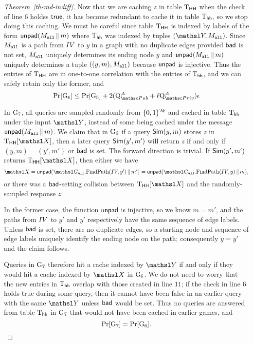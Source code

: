 \begin{proof}[Theorem~\ref{th-md-indiff}]
Now that we are caching $z$ in table $\text{T}_{\mathsf{HH}}$ when the check of line $6$ holdss $\mathsf{true}$,
it has become redundant to cache it in table $\text{T}_{\mathsf{hh}}$, so we stop doing this caching.
We must be careful since table $\text{T}_{\mathsf{HH}}$ is indexed by labels of the form $\mathsf{unpad}({M}_{\texttt{all}} {\,\|\,} m)$
where $\text{T}_{\mathsf{hh}}$ was indexed by tuples $(\YEDSA, \msg_{\all})$.
Since ${M}_{\texttt{all}}$ is a path from $IV$ to $y$ in a
graph with no duplicate edges provided $\mathsf{bad}$ is not set, ${M}_{\texttt{all}}$ uniquely
determines its ending node $y$ and $\mathsf{unpad}({M}_{\texttt{all}}{\,\|\,} m)$ uniquely determines a tuple
$((y, m), {M}_{\texttt{all}})$ because $\mathsf{unpad}$ is injective.
Thus the entries of $\text{T}_{\mathsf{HH}}$ are in one-to-one correlation with the entries of $\text{T}_{\mathsf{hh}}$, and we can safely retain only the former, and 
\[ \Pr[\Gm_6] \leq \Pr[\Gm_5] + 2(\Queries{\PubO}{\advA} + \ell \Queries{\PrivO}{\advA}) \epsilon \]

In $\textnormal{G}_7$, all queries are sampled randomly from $\{0,1\}^{2k}$ and cached in table $\text{T}_{\mathsf{hh}}$ under
the input $\YEDSA$, instead of some being cached under the message $\mathsf{unpad}({M}_{\texttt{all}} {\,\|\,} m)$.
We claim that in $\textnormal{G}_6$ if a query $\mathsf{Sim}(y, m)$ stores $z$ in $\THH[\XEDSA]$, then a later query $\mathsf{Sim}(y', m')$ will return $z$ if and only if $(y, m) = (y', m')$ or $\mathsf{bad}$ is set.
The forward direction is trivial.
If $\mathsf{Sim}(y', m')$ returns $\THH[\XEDSA]$, then either we have 
\[\XEDSA = \UnPadF(\graph_{\all}.\ppathO(\IV, y') \concat m') = \UnPadF(\graph_{\all}.\ppathO(\IV, y) \concat m),\]
or there was a $\mathsf{bad}$-setting collision between $\THH[\XEDSA]$ and the randomly-sampled response $z$.

In the former case, the function $\mathsf{unpad}$ is injective, so we know $m = m'$, and the paths from $IV$ to $y'$ and $y'$ respectively have the same
sequence of edge labels.
Unless $\mathsf{bad}$ is set, there are no duplicate edges, so a starting node and sequence of edge labels uniquely identify the ending node on the path; consequently $y = y'$ and the claim follows.

Queries in $\textnormal{G}_7$ therefore hit a cache indexed by $\YEDSA$ if and only if they would hit a cache indexed by $\XEDSA$ in $\textnormal{G}_6$.
We do not need to worry that the new entries in $\text{T}_{\mathsf{hh}}$ overlap with those created in line
$11$; if the check in line $6$ holds true during some query, then it cannot have been false in an earlier query with the same $\YEDSA$
unless $\mathsf{bad}$ would be set. Thus no queries are answered from table $\text{T}_{\mathsf{hh}}$ in $\textnormal{G}_7$ that would not have been
cached in earlier games, and
\[ \Pr[\textnormal{G}_7] = \Pr[\textnormal{G}_6]. \]


\end{proof}
